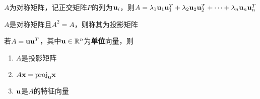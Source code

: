 \begin{theorem}[谱分解]
$A$为对称矩阵，记正交矩阵$P$的列为$\mathbf{u}_i$，则$A=\lambda_1\mathbf{u}_1\mathbf{u}_1^T+\lambda_2\mathbf{u}_2\mathbf{u}_2^T+\cdots+\lambda_n\mathbf{u}_n\mathbf{u}_n^T$
\end{theorem}
\begin{definition}[投影矩阵]
$A$是对称矩阵且$A^2=A$，则称其为投影矩阵
\end{definition}
\begin{proposition}
若$A=\mathbf{u}\mathbf{u}^T$，其中$\mathbf{u}\in\mathbb{R}^n$为\textbf{单位}向量，则
\begin{enumerate}
	\itemsep -3pt
	\item $A$是投影矩阵
	\item $A\mathbf{x}=\mathrm{proj}_{\mathbf{u}}\mathbf{x}$
	\item $\mathbf{u}$是$A$的特征向量
\end{enumerate}
\end{proposition}

